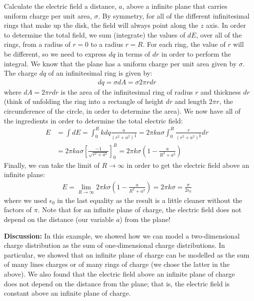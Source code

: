 \begin{example}{\label{ex:chargesfields:squarecircle}Calculate the electric field a distance, $a$, above a infinite plane that carries uniform charge per unit area, $\sigma$.}
By symmetry, for all of the different infinitesimal rings that make up the disk, the field will always point along the $z$ axis. In order to determine the total field, we sum (integrate) the values of $dE$, over all of the rings, from a radius of $r=0$ to a radius $r=R$. For each ring, the value of $r$ will be different, so we need to express $dq$ in terms of $dr$ in order to perform the integral. We know that the plane has a uniform charge per unit area given by $\sigma$. The charge $dq$ of an infinitesimal ring is given by:
\begin{align*}
dq = \sigma dA=\sigma 2\pi r dr
\end{align*}
where $dA=2\pi r dr$ is the area of the infinitesimal ring of radius $r$ and thickness $dr$ (think of unfolding the ring into a rectangle of height $dr$ and length $2\pi r$, the circumference of the circle, in order to determine the area). We now have all of the ingredients in order to determine the total electric field:
\begin{align*}
E &= \int dE = \int_0^R kdq\frac{a}{(r^2+a^2)^\frac{3}{2}}  = 2\pi k a \sigma \int_0^R \frac{r}{(r^2+a^2)^\frac{3}{2}}dr\\
&=2\pi k a \sigma \left[  \frac{-1}{\sqrt{r^2+a^2}}\right]_0^R=2\pi k  \sigma\left(1-\frac{a}{R^2+a^2} \right)
\end{align*}
Finally, we can take the limit of $R\to\infty$ in order to get the electric field above an infinite plane:
\begin{align*}
E=\lim_{R\to\infty}2\pi k  \sigma\left(1-\frac{a}{R^2+a^2} \right)=2\pi k\sigma=\frac{\sigma}{2\epsilon_0}
\end{align*}
where we used $\epsilon_0$ in the last equality as the result is a little cleaner without the factors of $\pi$. Note that for an infinite plane of charge, the electric field does not depend on the distance (our variable $a$) from the plane!

\textbf{Discussion:} In this example, we showed how we can model a two-dimensional charge distribution as the sum of one-dimensional charge distributions. In particular, we showed that an infinite plane of charge can be modelled as the sum of many lines charges or of many rings of charge (we chose the latter in the above). We also found that the electric field above an infinite plane of charge does not depend on the distance from the plane; that is, the electric field is constant above an infinite plane of charge. 
\end{example}

